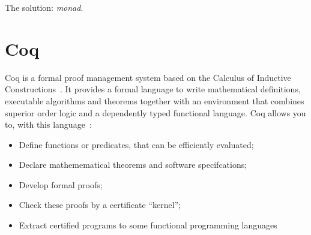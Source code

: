 The solution: \textit{monad}.

\section{Coq} 
Coq is a formal proof management system based on the Calculus of Inductive
Constructions~\cite{coqart}. It provides a formal language to write mathematical
definitions, executable algorithms and theorems together with an environment
that combines superior order logic and a dependently typed functional language.
Coq allows you to, with this language~\cite{coqsite}:
\begin{itemize}
\item Define functions or predicates, that can be efficiently evaluated;
\item Declare mathemematical theorems and software specifcations;
\item Develop formal proofs;
\item Check these proofs by a certificate ``kernel'';
\item Extract certified programs to some functional programming languages
\end{itemize}


\iffalse
Coq é um provador de teoremas automatizado baseado na
linguagem formal Calculo de Construções Indutivas\cite{coqart}, o qual em si
mesmo combina tanto lógica de ordem superior quanto uma linguagem funtional
ricamente-tipada. Através de uma linguagem vernacular de comandos, Coq
permite: \begin{itemize} \item definir funções ou predicados, que podem ser
avaliados eficientemente; \item declarar teoremas matemáticos e
especificações de software; \item desenvolver provas formas destes teoremas
de forma iterativa; \item checar estas provas por uma certificação de
kernel relativamente pequena; \item extrair programas certificados para
Objective Caml, Haskell ou Scheme.  \end{itemize} Como um sistema de
desenvolvimento de provas, Coq provê métodos de provas iterativos,
algoritmos de decisão e semi-decisão, e uma linguagem de tatica que permite
o usuário definir seus próprios métodos de prova. Conexão com uma
calculadora de sistema algébrico externo e outros provadores de teoremas
está disponível.  Como uma plataforma de formalização matemática ou de
desenvolvimento de programas, coq provê suporte para notações de alta ordem,
conteúdos implicitos e vários outros tipos úteis de macros.
\fi










